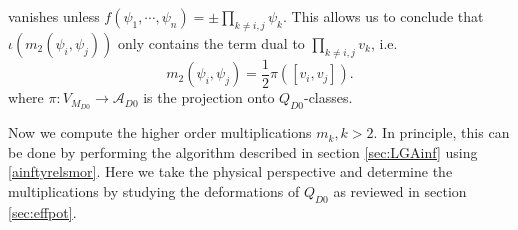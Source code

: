 \documentclass[a4paper,11pt]{article}
\numberwithin{equation}{section}
\begin{document}
vanishes unless $f(\psi_1,\cdots,\psi_n) = \pm \prod_{k \neq i,j}\psi_k$. This 
allows us to conclude that $\iota(m_2(\psi_i,\psi_j))$ only contains the term 
dual to 
$\prod_{k \neq i,j}v_k$, i.e.
\begin{equation}
m_2(\psi_i,\psi_j) = \frac{1}{2}\pi([v_i, v_j]).
\end{equation}
where $\pi:V_{M_{D0}}\rightarrow \mathcal{A}_{D0}$ is the projection onto 
$Q_{D0}$-classes.

Now we compute the higher order multiplications $m_k, k>2$. In principle, 
this can be done by performing the algorithm described in section 
\ref{sec:LGAinf} using \eqref{ainftyrelsmor}. Here we take the physical 
perspective and determine the multiplications by studying the deformations of 
$Q_{D0}$ as reviewed in section \ref{sec:effpot}.
\end{document}
